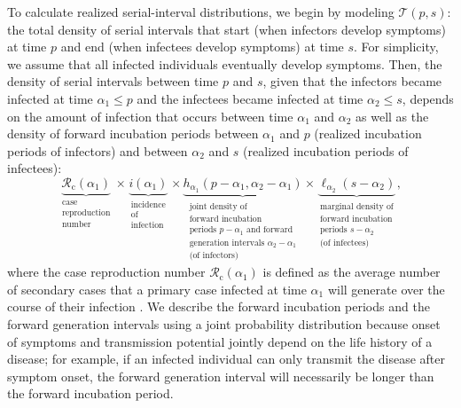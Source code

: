 \documentclass[12pt]{article}
\newcommand{\Rx}[1]{\ensuremath{{\mathcal R}_{#1}}\xspace}
\newcommand{\Rc}{\Rx{\mathrm{c}}}
\newcommand{\psymp}{\ensuremath{p}} %
\newcommand{\ssymp}{\ensuremath{s}} %
\newcommand{\pinf}{\ensuremath{\alpha_1}} %
\newcommand{\sinf}{\ensuremath{\alpha_2}} %
\newcommand{\idist}{\ell} %
\newcommand{\total}{{\mathcal T}} %
\begin{document}
To calculate realized serial-interval distributions, we begin by modeling $\total(\psymp,\ssymp)$: the total density of serial intervals that start (when infectors develop symptoms) at time $\psymp$ and end (when infectees develop symptoms) at time $\ssymp$.
For simplicity, we assume that all infected individuals eventually develop symptoms.
Then, the density of serial intervals between time $\psymp$ and $\ssymp$,
given that the infectors became infected at time $\pinf\le\psymp$ and
the infectees became infected at time $\sinf\le\ssymp$, depends on the
amount of infection that occurs between time $\pinf$ and $\sinf$ as well as
the density of forward incubation periods between $\pinf$ and
$\psymp$ (realized incubation periods of infectors) and between
$\sinf$ and $\ssymp$ (realized incubation periods of infectees):
\begin{equation}
\underbrace{\Rc (\pinf)}_{\substack{\text{case} \\ \text{reproduction} \\ \text{number}}} 
\times 
\underbrace{i(\pinf)}_{\substack{\text{incidence} \\ \text{of} \\ \text{infection}}} 
\times 
\underbrace{h_{\pinf}(\psymp-\pinf, \sinf - \pinf)}_{\substack{\text{joint density of} \\ \text{forward incubation} \\ \text{periods } p-\pinf \text{ and forward} \\ \text{generation intervals } \sinf-\pinf\\ \text{(of infectors)}}}
\times
\underbrace{\idist_{\sinf}(\ssymp - \sinf)}_{\substack{\text{marginal density of} \\ \text{forward incubation} \\ \text{periods } \ssymp-\sinf \\ \text{(of infectees)}}},
\end{equation}
where the case reproduction number $\Rc (\pinf)$ is defined as the average number of secondary cases that a primary case infected at time $\pinf$ will generate over the course of their infection \citep{fraser2007estimating}.
We describe the forward incubation periods and the forward generation intervals using a joint probability distribution because onset of symptoms and transmission potential jointly depend on the life history of a disease;
for example, if an infected individual can only transmit the disease after symptom onset, the forward generation interval will necessarily be longer than the forward incubation period.
\end{document}
